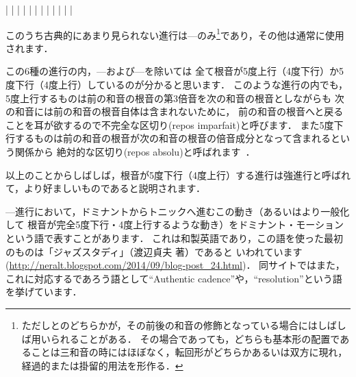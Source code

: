 \documentclass[dvipdfmx,uplatex,b5paper,openany,jbase=12Q,nomag*,textwidth-limit=44%
               ]{gachimuchi}[2020/05/05]
\begin{document}
\begin{Music}
  \Startpiece
  \NOTes%
  |%
  \en%
  \NOTes%
  |%
  \en\doublebar%
  \NOTes%
  |%
  \en%
  \NOTes%
  |%
  \en\doublebar%
  \NOTes%
  |%
  \en%
  \NOTes%
  |%
  \en\doublebar%
  \NOTes%
  |%
  \en%
  \NOTes%
  |%
  \en\doublebar%
  \NOTes%
  |%
  \en%
  \NOTes%
  |%
  \en\doublebar%
  \NOTes%
  |%
  \en%
  \NOTes%
  |%
  \en\setdoublebar%
  \endpiece{}%
\end{Music}


このうち古典的にあまり見られない進行は---のみ\footnote{%
  ただしとのどちらかが，その前後の和音の修飾となっている場合にはしばしば用いられることがある．
  その場合であっても，どちらも基本形の配置であることは三和音の時にはほぼなく，転回形がどちらかあるいは双方に現れ，
  経過的または掛留的用法を形作る．
}であり，その他は通常に使用されます．
\begin{Yodan}
この6種の進行の内，---および---を除いては
全て根音が5度上行（4度下行）か5度下行（4度上行）しているのが分かると思います．
このような進行の内でも，5度上行するものは前の和音の根音の第3倍音を次の和音の根音としながらも
次の和音には前の和音の根音自体は含まれないために，
前の和音の根音へと戻ることを耳が欲するので不完全な区切り(repos imparfait)と呼びます．
また5度下行するものは前の和音の根音が次の和音の根音の倍音成分となって含まれるという関係から
絶対的な区切り(repos absolu)と呼ばれます~\cite{chRAMEAU1}．

以上のことからしばしば，根音が5度下行（4度上行）する進行は強進行と呼ばれて，より好ましいものであると説明されます．
\end{Yodan}
\begin{Yodan}
  ---進行において，ドミナントからトニックへ進むこの動き（あるいはより一般化して
  根音が完全5度下行・4度上行するような動き）をドミナント・モーションという語で表すことがあります．
  これは和製英語であり，この語を使った最初のものは「ジャズスタディ」（渡辺貞夫 著）であると
  いわれています(\url{http://neralt.blogspot.com/2014/09/blog-post_24.html})．
  同サイトではまた，これに対応するであろう語として``Authentic cadence''や，``resolution''という語を挙げています．
\end{Yodan}
\end{document}

